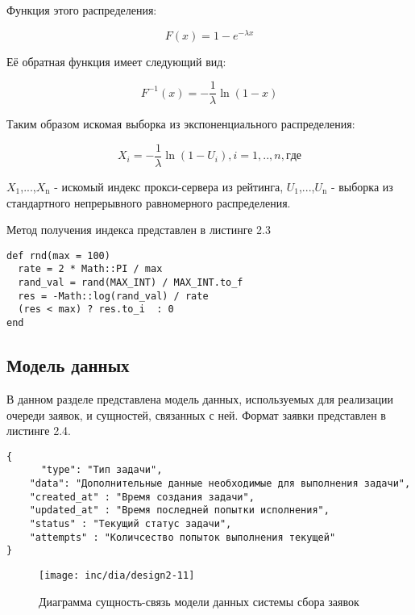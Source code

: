  Функция этого распределения:

\begin{equation}
F(x) = 1 - e^{-\lambda x}
\label{F:F2}
\end{equation}

Её обратная функция имеет следующий вид:

\begin{equation}
F^{-1}(x) = -\frac{1}{\lambda}\ln(1 - x)
\label{F:F2}
\end{equation}

Таким образом искомая выборка из экспоненциального распределения:

\begin{equation}
X_i = -\frac{1}{\lambda}\ln(1 - U_i), i = 1,..,n, где
\label{F:F2}
\end{equation}

$X_{\text{1}}$,...,$X_{\text{n}}$ - искомый индекс прокси-сервера из рейтинга, $U_{\text{1}}$,...,$U_{\text{n}}$ - выборка из стандартного непрерывного равномерного распределения.

Метод получения индекса представлен в листинге 2.3

\begin{lstlisting}[caption=Выборка прокси-сервера]
def rnd(max = 100)
  rate = 2 * Math::PI / max
  rand_val = rand(MAX_INT) / MAX_INT.to_f
  res = -Math::log(rand_val) / rate
  (res < max) ? res.to_i  : 0
end
\end{lstlisting}

\subsection{Модель данных}

В данном разделе представлена модель данных, используемых для реализации очереди заявок, и сущностей, связанных с ней. Формат заявки представлен в листинге 2.4. 
\begin{lstlisting}[caption=Заявка]
{     
      "type": "Тип задачи",
    "data": "Дополнительные данные необходимые для выполнения задачи",
    "created_at" : "Время создания задачи",
    "updated_at" : "Время последней попытки исполнения",
    "status" : "Текущий статус задачи",
    "attempts" : "Количсество попыток выполнения текущей"
}
\end{lstlisting}


\begin{figure}
  \centering  
  \texttt{[image: inc/dia/design2-11]}
  \caption{Диаграмма сущность-связь модели данных системы сбора заявок}
  \label{fig:11}
\end{figure}

